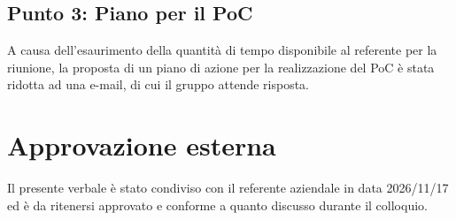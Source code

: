 \documentclass[a4paper, 11pt]{article}
\begin{document}
\subsection{Punto 3: Piano per il PoC}
A causa dell'esaurimento della quantità di tempo disponibile al referente per la riunione, la proposta di un piano di azione per la realizzazione del PoC è stata ridotta ad una e-mail, di cui il gruppo attende risposta.
\newpage


\section{Approvazione esterna}
Il presente verbale è stato condiviso con il referente aziendale in data 2026/11/17 ed è da ritenersi approvato e conforme a quanto discusso durante il colloquio. 
\end{document}
